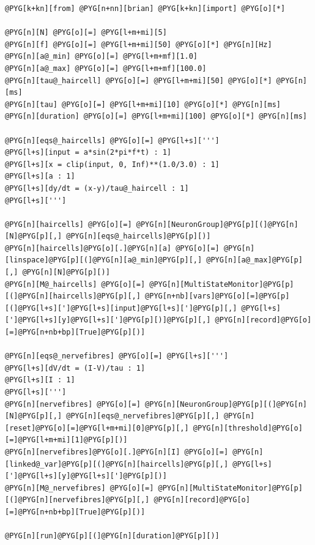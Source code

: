 \documentclass[letterpaper,10pt,english]{manual}
\begin{document}
\begin{Verbatim}[commandchars=@\[\]]
@PYG[k+kn][from] @PYG[n+nn][brian] @PYG[k+kn][import] @PYG[o][*]

@PYG[n][N] @PYG[o][=] @PYG[l+m+mi][5]
@PYG[n][f] @PYG[o][=] @PYG[l+m+mi][50] @PYG[o][*] @PYG[n][Hz]
@PYG[n][a@_min] @PYG[o][=] @PYG[l+m+mf][1.0]
@PYG[n][a@_max] @PYG[o][=] @PYG[l+m+mf][100.0]
@PYG[n][tau@_haircell] @PYG[o][=] @PYG[l+m+mi][50] @PYG[o][*] @PYG[n][ms]
@PYG[n][tau] @PYG[o][=] @PYG[l+m+mi][10] @PYG[o][*] @PYG[n][ms]
@PYG[n][duration] @PYG[o][=] @PYG[l+m+mi][100] @PYG[o][*] @PYG[n][ms]

@PYG[n][eqs@_haircells] @PYG[o][=] @PYG[l+s][''']
@PYG[l+s][input = a*sin(2*pi*f*t) : 1]
@PYG[l+s][x = clip(input, 0, Inf)**(1.0/3.0) : 1]
@PYG[l+s][a : 1]
@PYG[l+s][dy/dt = (x-y)/tau@_haircell : 1]
@PYG[l+s][''']

@PYG[n][haircells] @PYG[o][=] @PYG[n][NeuronGroup]@PYG[p][(]@PYG[n][N]@PYG[p][,] @PYG[n][eqs@_haircells]@PYG[p][)]
@PYG[n][haircells]@PYG[o][.]@PYG[n][a] @PYG[o][=] @PYG[n][linspace]@PYG[p][(]@PYG[n][a@_min]@PYG[p][,] @PYG[n][a@_max]@PYG[p][,] @PYG[n][N]@PYG[p][)]
@PYG[n][M@_haircells] @PYG[o][=] @PYG[n][MultiStateMonitor]@PYG[p][(]@PYG[n][haircells]@PYG[p][,] @PYG[n+nb][vars]@PYG[o][=]@PYG[p][(]@PYG[l+s][']@PYG[l+s][input]@PYG[l+s][']@PYG[p][,] @PYG[l+s][']@PYG[l+s][y]@PYG[l+s][']@PYG[p][)]@PYG[p][,] @PYG[n][record]@PYG[o][=]@PYG[n+nb+bp][True]@PYG[p][)]

@PYG[n][eqs@_nervefibres] @PYG[o][=] @PYG[l+s][''']
@PYG[l+s][dV/dt = (I-V)/tau : 1]
@PYG[l+s][I : 1]
@PYG[l+s][''']
@PYG[n][nervefibres] @PYG[o][=] @PYG[n][NeuronGroup]@PYG[p][(]@PYG[n][N]@PYG[p][,] @PYG[n][eqs@_nervefibres]@PYG[p][,] @PYG[n][reset]@PYG[o][=]@PYG[l+m+mi][0]@PYG[p][,] @PYG[n][threshold]@PYG[o][=]@PYG[l+m+mi][1]@PYG[p][)]
@PYG[n][nervefibres]@PYG[o][.]@PYG[n][I] @PYG[o][=] @PYG[n][linked@_var]@PYG[p][(]@PYG[n][haircells]@PYG[p][,] @PYG[l+s][']@PYG[l+s][y]@PYG[l+s][']@PYG[p][)]
@PYG[n][M@_nervefibres] @PYG[o][=] @PYG[n][MultiStateMonitor]@PYG[p][(]@PYG[n][nervefibres]@PYG[p][,] @PYG[n][record]@PYG[o][=]@PYG[n+nb+bp][True]@PYG[p][)]

@PYG[n][run]@PYG[p][(]@PYG[n][duration]@PYG[p][)]


\end{Verbatim}
\end{document}
